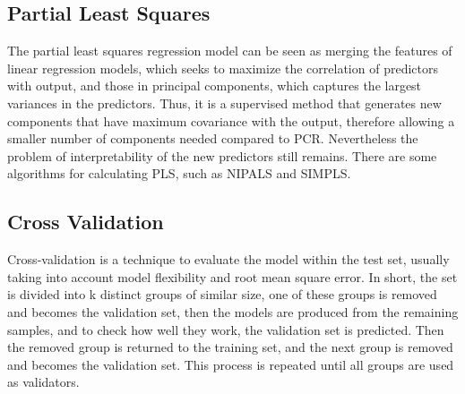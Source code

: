 \subsection{Partial Least Squares}
The partial least squares regression model can be seen as merging the features of linear regression models, which seeks to maximize the correlation of predictors with output, and those in principal components, which captures the largest variances in the predictors. Thus, it is a supervised method that generates new components that have maximum covariance with the output, therefore allowing a smaller number of components needed compared to PCR. Nevertheless the problem of interpretability of the new predictors still remains. There are some algorithms for calculating PLS, such as NIPALS and SIMPLS.

\subsection{Cross Validation}

Cross-validation is a technique to evaluate the model within the test set, usually taking into account model flexibility and root mean square error. In short, the set is divided into k distinct groups of similar size, one of these groups is removed and becomes the validation set, then the models are produced from the remaining samples, and to check how well they work, the validation set is predicted. Then the removed group is returned to the training set, and the next group is removed and becomes the validation set. This process is repeated until all groups are used as validators.


